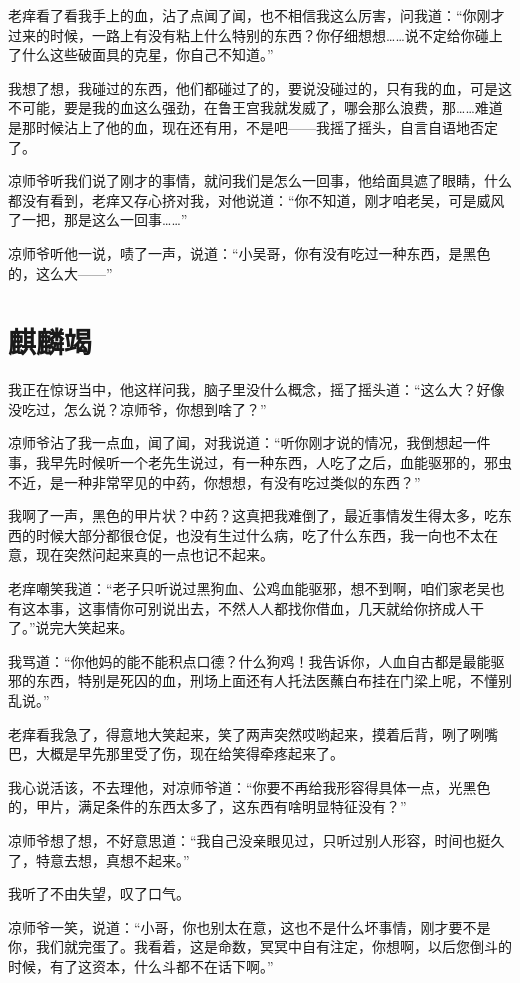 老痒看了看我手上的血，沾了点闻了闻，也不相信我这么厉害，问我道：“你刚才过来的时候，一路上有没有粘上什么特别的东西？你仔细想想……说不定给你碰上了什么这些破面具的克星，你自己不知道。”

我想了想，我碰过的东西，他们都碰过了的，要说没碰过的，只有我的血，可是这不可能，要是我的血这么强劲，在鲁王宫我就发威了，哪会那么浪费，那……难道是那时候沾上了他的血，现在还有用，不是吧——我摇了摇头，自言自语地否定了。

凉师爷听我们说了刚才的事情，就问我们是怎么一回事，他给面具遮了眼睛，什么都没有看到，老痒又存心挤对我，对他说道：“你不知道，刚才咱老吴，可是威风了一把，那是这么一回事……”

凉师爷听他一说，啧了一声，说道：“小吴哥，你有没有吃过一种东西，是黑色的，这么大——”

\chapter{麒麟竭}

我正在惊讶当中，他这样问我，脑子里没什么概念，摇了摇头道：“这么大？好像没吃过，怎么说？凉师爷，你想到啥了？”

凉师爷沾了我一点血，闻了闻，对我说道：“听你刚才说的情况，我倒想起一件事，我早先时候听一个老先生说过，有一种东西，人吃了之后，血能驱邪的，邪虫不近，是一种非常罕见的中药，你想想，有没有吃过类似的东西？”

我啊了一声，黑色的甲片状？中药？这真把我难倒了，最近事情发生得太多，吃东西的时候大部分都很仓促，也没有生过什么病，吃了什么东西，我一向也不太在意，现在突然问起来真的一点也记不起来。

老痒嘲笑我道：“老子只听说过黑狗血、公鸡血能驱邪，想不到啊，咱们家老吴也有这本事，这事情你可别说出去，不然人人都找你借血，几天就给你挤成人干了。”说完大笑起来。

我骂道：“你他妈的能不能积点口德？什么狗鸡！我告诉你，人血自古都是最能驱邪的东西，特别是死囚的血，刑场上面还有人托法医蘸白布挂在门梁上呢，不懂别乱说。”

老痒看我急了，得意地大笑起来，笑了两声突然哎哟起来，摸着后背，咧了咧嘴巴，大概是早先那里受了伤，现在给笑得牵疼起来了。

我心说活该，不去理他，对凉师爷道：“你要不再给我形容得具体一点，光黑色的，甲片，满足条件的东西太多了，这东西有啥明显特征没有？”

凉师爷想了想，不好意思道：“我自己没亲眼见过，只听过别人形容，时间也挺久了，特意去想，真想不起来。”

我听了不由失望，叹了口气。

凉师爷一笑，说道：“小哥，你也别太在意，这也不是什么坏事情，刚才要不是你，我们就完蛋了。我看着，这是命数，冥冥中自有注定，你想啊，以后您倒斗的时候，有了这资本，什么斗都不在话下啊。”

